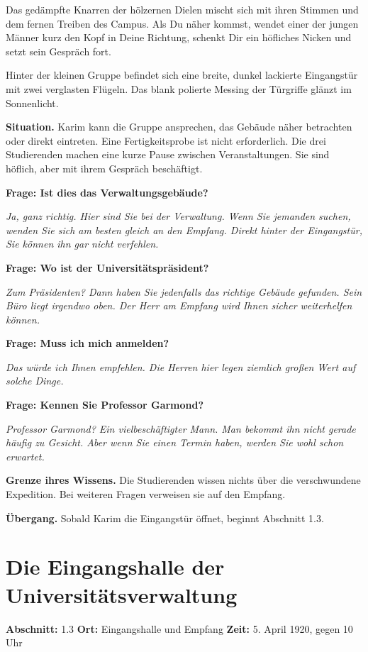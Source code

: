 \begin{vorlesetext}
Das gedämpfte Knarren der hölzernen Dielen mischt sich mit ihren Stimmen und dem fernen Treiben des Campus. Als Du näher kommst, wendet einer der jungen Männer kurz den Kopf in Deine Richtung, schenkt Dir ein höfliches Nicken und setzt sein Gespräch fort.

Hinter der kleinen Gruppe befindet sich eine breite, dunkel lackierte Eingangstür mit zwei verglasten Flügeln. Das blank polierte Messing der Türgriffe glänzt im Sonnenlicht.
\end{vorlesetext}

\begin{meisterinfo}
\textbf{Situation.} Karim kann die Gruppe ansprechen, das Gebäude näher betrachten oder direkt eintreten. Eine Fertigkeitsprobe ist nicht erforderlich. Die drei Studierenden machen eine kurze Pause zwischen Veranstaltungen. Sie sind höflich, aber mit ihrem Gespräch beschäftigt.

\medskip
\textbf{Frage: Ist dies das Verwaltungsgebäude?}

\emph{\glqq{}Ja, ganz richtig. Hier sind Sie bei der Verwaltung. Wenn Sie jemanden suchen, wenden Sie sich am besten gleich an den Empfang. Direkt hinter der Eingangstür, Sie können ihn gar nicht verfehlen.\grqq{}}

\medskip
\textbf{Frage: Wo ist der Universitätspräsident?}

\emph{\glqq{}Zum Präsidenten? Dann haben Sie jedenfalls das richtige Gebäude gefunden. Sein Büro liegt irgendwo oben. Der Herr am Empfang wird Ihnen sicher weiterhelfen können.\grqq{}}

\medskip
\textbf{Frage: Muss ich mich anmelden?}

\emph{\glqq{}Das würde ich Ihnen empfehlen. Die Herren hier legen ziemlich gro\ss{}en Wert auf solche Dinge.\grqq{}}

\medskip
\textbf{Frage: Kennen Sie Professor Garmond?}

\emph{\glqq{}Professor Garmond? Ein vielbeschäftigter Mann. Man bekommt ihn nicht gerade häufig zu Gesicht. Aber wenn Sie einen Termin haben, werden Sie wohl schon erwartet.\grqq{}}

\medskip
\textbf{Grenze ihres Wissens.} Die Studierenden wissen nichts über die verschwundene Expedition. Bei weiteren Fragen verweisen sie auf den Empfang.

\textbf{Übergang.} Sobald Karim die Eingangstür öffnet, beginnt Abschnitt 1.3.
\end{meisterinfo}

\clearpage
\section{Die Eingangshalle der Universitätsverwaltung}
\label{sec:verwaltung-innen}
\noindent\textbf{Abschnitt:} 1.3\quad
\textbf{Ort:} Eingangshalle und Empfang\quad
\textbf{Zeit:} 5. April 1920, gegen 10 Uhr

